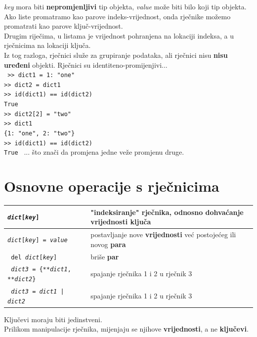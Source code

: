\documentclass[10pt]{article}
\begin{document}
    \begin{center}
        \footnotesize
        \textit{key} mora biti \textbf{nepromjenljivi} tip objekta, \textit{value} može biti bilo koji tip objekta. \\
        Ako liste promatramo kao parove indeks-vrijednost, onda rječnike možemo promatrati kao parove ključ-vrijednost. \\
        Drugim riječima, u listama je vrijednost pohranjena na lokaciji indeksa, a u rječnicima na lokaciji ključa. \\
        Iz tog razloga, rječnici služe za grupiranje podataka, ali rječnici nisu \textbf{nisu uređeni} objekti.
        Rječnici su identiteno-promijenjivi... \\
        \texttt{
            >> dict1 = {1: "one"} \\
            >> dict2 = dict1 \\
            >> id(dict1) == id(dict2) \\
            True \\
            >> dict2[2] = "two" \\
            >> dict1 \\
            \{1: "one", 2: "two"\} \\
            >> id(dict1) == id(dict2) \\
            True
        }
        ... što znači da promjena jedne veže promjenu druge.
    \end{center}

    \section*{\color{NavyBlue} Osnovne operacije s rječnicima}
    \begin{tabular}{|>{\tt}p{9.00cm}|>{}p{15.50cm}|}
        \hline
        \textit{dict}[\textit{key}] & "indeksiranje" rječnika, odnosno dohvaćanje \textbf{vrijednosti} ključa
        \\ \hline
        \textit{dict}[\textit{key}] = \textit{value} & postavljanje nove \textbf{vrijednosti} već postojećeg ili novog \textbf{para}
        \\ \hline
        del \textit{dict}[\textit{key}] & briše \textbf{par}
        \\ \hline
        \textit{dict3} = \{**\textit{dict1}, **\textit{dict2}\} & spajanje rječnika 1 i 2 u rječnik 3
        \\ \hline
        \textit{dict3} = \textit{dict1} | \textit{dict2} & spajanje rječnika 1 i 2 u rječnik 3
        \\ \hline
    \end{tabular}
    \begin{center}
        \footnotesize
        Ključevi moraju biti jedinstveni. \\
        Prilikom manipulacije rječnika, mijenjaju se njihove \textbf{vrijednosti}, a ne \textbf{ključevi}.
    \end{center}
\end{document}
